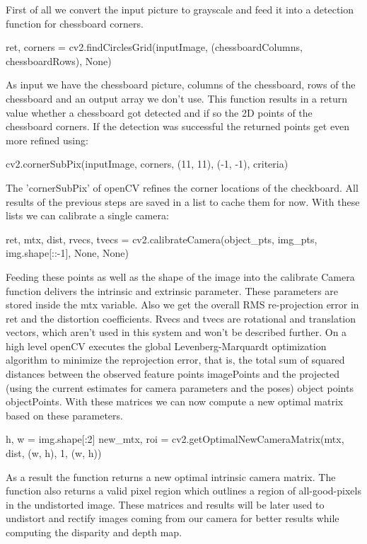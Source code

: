 \documentclass[journal,onecolumn]{IEEEtran}
\begin{document}
First of all we convert the input picture to grayscale and feed it into a detection function for chessboard corners.
\begin{python}
ret, corners = cv2.findCirclesGrid(inputImage,
				  (chessboardColumns, chessboardRows),
				  None)
\end{python}
As input we have the chessboard picture, columns of the chessboard, rows of the chessboard and an output array we don't use.
This function results in a return value whether a chessboard got detected and if so the 2D points of the chessboard corners. If the detection was successful the returned points get even more refined using:
\begin{python}
cv2.cornerSubPix(inputImage,
		corners,
		(11, 11),
		(-1, -1),
		criteria)
\end{python}
The 'cornerSubPix' of openCV refines the corner locations \cite{forstner} of the checkboard.
All results of  the previous steps are saved in a list to cache them for now. With these lists we can calibrate a single camera:
\begin{python}
ret, mtx, dist, rvecs, tvecs = cv2.calibrateCamera(object_pts,
						   img_pts,
						   img.shape[::-1], None, None)
\end{python}
Feeding these points as well as the shape of the image into the calibrate Camera function delivers the intrinsic and extrinsic parameter.
These parameters are stored inside the mtx variable. Also we get the overall RMS re-projection error in ret and the distortion coefficients. Rvecs\cite{DBLP} and tvecs are rotational and translation vectors, which aren't used in this system and won't be described further.
On a high level openCV executes the global Levenberg-Marquardt optimization algorithm to minimize the reprojection error, that is, the total sum of squared distances between the observed feature points imagePoints and the projected (using the current estimates for camera parameters and the poses) object points objectPoints\cite{calibrateCamera}.
With these matrices we can now compute a new optimal matrix based on these parameters.
\begin{python}
h, w = img.shape[:2]
new_mtx, roi = cv2.getOptimalNewCameraMatrix(mtx,
				   	     dist,
				   	     (w, h), 1, (w, h))
\end{python}
As a result the function returns a new optimal intrinsic camera matrix. The function also returns a valid pixel region which outlines a region of all-good-pixels in the undistorted image. These matrices and results will be later used to undistort and rectify images coming from our camera for better results while computing the disparity and depth map.
\end{document}
